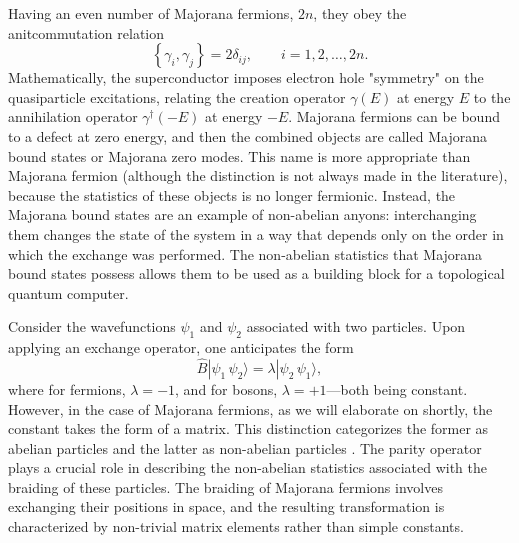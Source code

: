 \documentclass{article}
\begin{document}
Having an even number of Majorana fermions, $ 2n $, they obey the anitcommutation relation
\begin{equation}
	\left\{\gamma_i, \gamma_j\right\}=2 \delta_{i j}, \qquad i=1, 2, \dots, 2n  .
\end{equation}
Mathematically, the superconductor imposes electron hole "symmetry" on the quasiparticle excitations, relating the creation operator $\gamma(E)$ at energy $E$ to the annihilation operator $\gamma^{\dagger}(-E)$ at energy $-E$.\cite{Majorana-returns} Majorana fermions can be bound to a defect at zero energy, and then the combined objects are called Majorana bound states or Majorana zero modes. This name is more appropriate than Majorana fermion (although the distinction is not always made in the literature), because the statistics of these objects is no longer fermionic. Instead, the Majorana bound states are an example of non-abelian anyons: interchanging them changes the state of the system in a way that depends only on the order in which the exchange was performed. The non-abelian statistics that Majorana bound states possess allows them to be used as a building block for a topological quantum computer.

Consider the wavefunctions $ \psi_1 $ and $ \psi_2 $ associated with two particles. Upon applying an exchange operator, one anticipates the form
\begin{equation}
	\hat{B} | \psi_1\, \psi_2 \rangle = \lambda | \psi_2\, \psi_1 \rangle,
\end{equation}
where for fermions, $ \lambda = -1 $, and for bosons, $ \lambda = +1 $—both being constant. However, in the case of Majorana fermions, as we will elaborate on shortly, the constant takes the form of a matrix. This distinction categorizes the former as abelian particles and the latter as non-abelian particles \cite{Nayak_2008}. The parity operator plays a crucial role in describing the non-abelian statistics associated with the braiding of these particles. The braiding of Majorana fermions involves exchanging their positions in space, and the resulting transformation is characterized by non-trivial matrix elements rather than simple constants.
\end{document}
